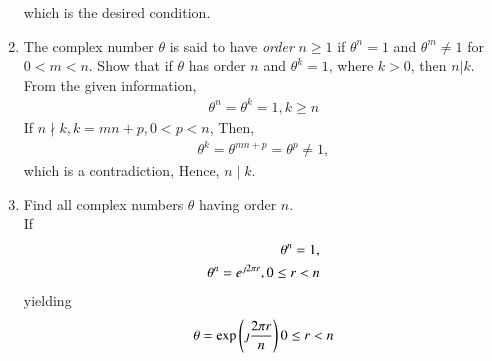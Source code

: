 \begin{enumerate}[label=\arabic*.,ref=\thesubsection.\theenumi]
which is the desired condition.
\item The complex number $\theta$ is said to have {\em order} $n \ge 1$ if $\theta^{n} = 1$ and $\theta^{m} \ne 1$ for $0 < m < n$.  Show that if $\theta $ has order $n$ and $\theta^k = 1$, where $k > 0$, then $n | k$. 
	\\
	\solution From the given information, 
	\begin{align}
		\theta^{n} = \theta^{k} = 1, k \ge n
	\end{align}
	If $n \nmid k, k = mn+p, 0 < p < n$,  Then, 
	\begin{align}
		\theta^{k} = \theta^{mn+p} = \theta^{p} \ne 1,
	\end{align}
	which is a contradiction, Hence, $n \mid k$.
\item Find all complex numbers $\theta$ having order $n$.
	\\
	\solution If 
	\begin{align}
		\theta^{n} = 1,
		\\
		\theta^{n}= e^{\jmath 2\pi r}, 0 \le r < n 
	\end{align}
	yielding
	\begin{align}
		\theta = \exp\left(\jmath \frac{2\pi r}{n}\right) 0 \le r < n
	\end{align}
\end{enumerate}
